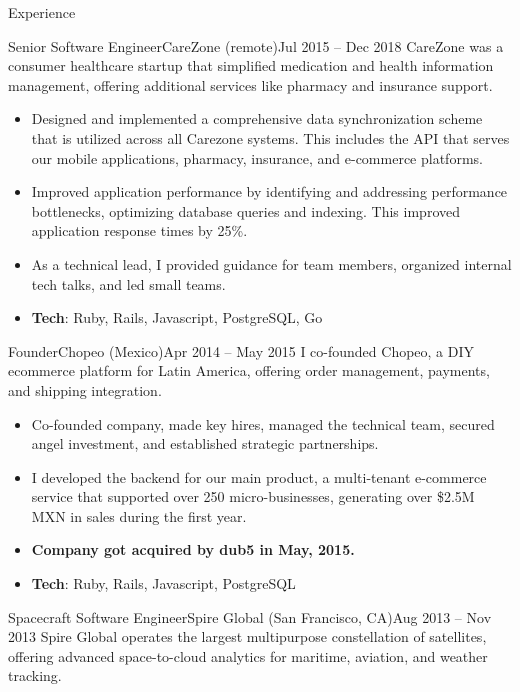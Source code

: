\documentclass[colibri]{mcdowellcv}
\begin{document}
\begin{cvsection}{Experience}
\begin{cvsubsection}{Senior Software Engineer}{CareZone (remote)}{Jul 2015 -- Dec 2018}
    CareZone was a consumer healthcare startup that simplified medication and health
    information management, offering additional services like pharmacy and insurance
    support.
		\begin{itemize}
    \item
      Designed and implemented a comprehensive data synchronization scheme that is
      utilized across all Carezone systems. This includes the API that serves our
      mobile applications, pharmacy, insurance, and e-commerce platforms.
    \item
      Improved application performance by identifying and addressing performance
      bottlenecks, optimizing database queries and indexing. This improved
      application response times by 25\%.
    \item
      As a technical lead, I provided guidance for team members, organized
      internal tech talks, and led small teams.
    \item \textbf{Tech}: Ruby, Rails, Javascript, PostgreSQL, Go
		\end{itemize}
	\end{cvsubsection}
	\begin{cvsubsection}{Founder}{Chopeo (Mexico)}{Apr 2014 -- May 2015}
    I co-founded Chopeo, a DIY ecommerce platform for Latin America, offering
    order management, payments, and shipping integration.
		\begin{itemize}
    \item
      Co-founded company, made key hires, managed the technical team, secured
      angel investment, and established strategic partnerships.
    \item
      I developed the backend for our main product, a multi-tenant e-commerce service
      that supported over 250 micro-businesses, generating over \$2.5M MXN in
      sales during the first year.
    \item
      \textbf{Company got acquired by dub5 in May, 2015.}
    \item \textbf{Tech}: Ruby, Rails, Javascript, PostgreSQL
		\end{itemize}
	\end{cvsubsection}
	\begin{cvsubsection}{Spacecraft Software Engineer}{Spire Global (San Francisco, CA)}{Aug 2013 -- Nov 2013}
    Spire Global operates the largest multipurpose constellation of satellites,
    offering advanced space-to-cloud analytics for maritime, aviation, and weather
    tracking.
    \begin{itemize}

\end{itemize}
\end{cvsubsection}
\end{cvsection}
\end{document}
